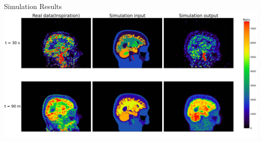 \documentclass[aspectratio=169]{beamer}
\begin{document}
\begin{frame}{Simulation Results}
	\includegraphics[width=\textwidth]{sim_compare2.jpg}

\end{frame}
\end{document}
